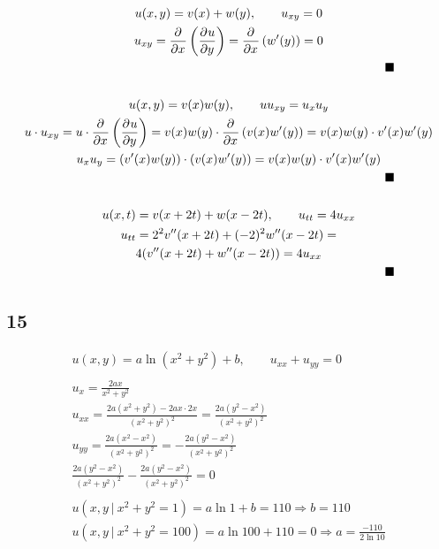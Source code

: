 \begin{gather*}
	u(x, y) = v(x) + w(y), \qquad u_{xy} = 0
	\\
	u_{xy} = \frac{\partial^{} }{\partial x^{}} \left(
		\frac{\partial^{} u}{\partial y^{}}
	\right)
	=
	\frac{\partial^{} }{\partial x^{}} \left(
		w'(y)
	\right)
	= 0
	\\
	\qquad\qquad\qquad\qquad\qquad\qquad\qquad\qquad\qquad\qquad\qquad\qquad\qquad \blacksquare
	\\
	\\
	u(x, y) = v(x) w(y), \qquad u u_{xy} = u_x u_y
	\\
	u \cdot u_{xy} = u \cdot \frac{\partial^{} }{\partial x^{}} \left(
		\frac{\partial^{} u}{\partial y^{}}
	\right)
	=
	v(x) w(y) \cdot \frac{\partial^{} }{\partial x^{}} \left(
		v(x) w'(y)
	\right)
	=
	v(x) w(y) \cdot v'(x) w'(y)
	\\
	u_x u_y = (v'(x) w(y)) \cdot (v(x) w'(y))
	=
	v(x) w(y) \cdot v'(x) w'(y)
	\\
	\qquad\qquad\qquad\qquad\qquad\qquad\qquad\qquad\qquad\qquad\qquad\qquad\qquad \blacksquare
	\\
	\\
	u(x, t) = v(x + 2 t) + w (x - 2 t), \qquad u_{tt} = 4 u_{xx}
	\\
	u_{tt} = 2^2 v''(x + 2 t) + (-2)^2 w''(x - 2 t)
	=
	\\
	4 (v''(x + 2 t) + w''(x - 2 t)) = 4 u_{xx}
	\\
	\qquad\qquad\qquad\qquad\qquad\qquad\qquad\qquad\qquad\qquad\qquad\qquad\qquad \blacksquare
\end{gather*}


\subsection*{15}

\begin{gather*}
	u(x, y) = a \ln{(x^2 + y^2)} + b, \qquad u_{xx} + u_{yy} = 0
	\\
	\\
	u_x = \frac{2 a x}{x^2 + y^2}
	\\
	u_{xx} = \frac{2 a \left(
		x^2 + y^2
	\right) - 2 a x \cdot 2 x}{\left(
		x^2 + y^2
	\right)^2}
	=
	\frac{2 a \left(
		y^2 - x^2
	\right)}{\left(
		x^2 + y^2
	\right)^2}
	\\
	u_{yy} = \frac{2 a \left(
		x^2 - x^2
	\right)}{\left(
		x^2 + y^2
	\right)^2}
	=
	-\frac{2 a \left(
		y^2 - x^2
	\right)}{\left(
		x^2 + y^2
	\right)^2}
	\\
	\frac{2 a \left(
		y^2 - x^2
	\right)}{\left(
		x^2 + y^2
	\right)^2}
	-
	\frac{2 a \left(
		y^2 - x^2
	\right)}{\left(
		x^2 + y^2
	\right)^2}
	=
	0
	\\
	\\
	u\left(
		x, y\ |\ x^2 + y^2 = 1
	\right) = a \ln{1} + b = 110
	\Rightarrow
	b = 110
	\\
	u\left(
		x, y\ |\ x^2 + y^2 = 100
	\right) = a \ln{100} + 110 = 0
	\Rightarrow
	a = \frac{-110}{2 \ln{10}}
\end{gather*}


